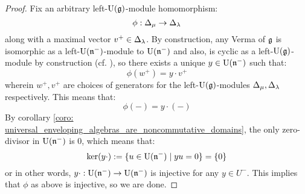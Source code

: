             \begin{proof}
                Fix an arbitrary left-$\mathrm{U}(\mathfrak{g})$-module homomorphism:
                    $$\phi: \Delta_{\mu} \to \Delta_{\lambda}$$
                along with a maximal vector $v^+ \in \Delta_{\lambda}$. By construction, any Verma of $\mathfrak{g}$ is isomorphic as a left-$\mathrm{U}(\mathfrak{n}^-)$-module to $\mathrm{U}(\mathfrak{n}^-)$ and also, is cyclic as a left-$\mathrm{U}(\mathfrak{g})$-module by construction (cf. \cite[Subsection 20.2]{humphreys_lie_algebras}), so there exists a unique $y \in \mathrm{U}(\mathfrak{n}^-)$ such that:
                    $$\phi(w^+) = y \cdot v^+$$
                wherein $w^+, v^+$ are choices of generators for the left-$\mathrm{U}(\mathfrak{g})$-modules $\Delta_{\mu}, \Delta_{\lambda}$ respectively. This means that:
                    $$\phi(-) = y \cdot (-)$$
                By corollary \ref{coro: universal_enveloping_algebras_are_noncommutative_domains}, the only zero-divisor in $\mathrm{U}(\mathfrak{n}^-)$ is $0$, which means that:
                    $$\ker(y \cdot) := \{u \in \mathrm{U}(\mathfrak{n}^-) \mid yu = 0\} = \{0\}$$
                or in other words, $y \cdot: \mathrm{U}(\mathfrak{n}^-) \to \mathrm{U}(\mathfrak{n}^-)$ is injective for any $y \in U^-$. This implies that $\phi$ as above is injective, so we are done. 
            \end{proof}
            
